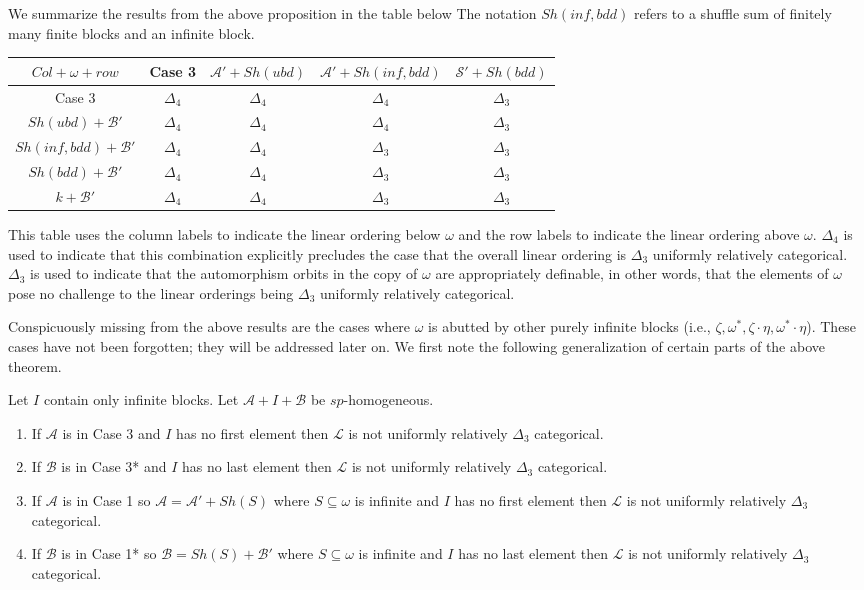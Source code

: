 \documentclass[11pt]{amsart}
\theoremstyle{definition}
\def\A{\mathcal A}
\def\B{\mathcal{B}}
\def\L{\mathcal L}
\def\S{{\mathcal S}}
\begin{document}
We summarize the results from the above proposition in the table below
The notation $Sh(inf, bdd)$ refers to a shuffle sum of finitely many finite blocks and an infinite block.
\begin{center}
\begin{tabular}{c|c|c|c|c}
     $Col+\omega+row$& Case 3 & $\A'+Sh(ubd)$ & $\A'+Sh(inf, bdd)$ & $\S'+Sh(bdd)$\\
     \hline
   Case 3  & $\Delta_4$ & $\Delta_4$ & $\Delta_4$ & $\Delta_3$  \\   \hline
   $Sh(ubd)+\B'$  & $\Delta_4$ & $\Delta_4$ & $\Delta_4$ & $\Delta_3$ \\  \hline
   $Sh(inf, bdd)+\B'$  & $\Delta_4$ & $\Delta_4$ & $\Delta_3$ & $\Delta_3$ \\  \hline
   $Sh(bdd)+\B'$  & $\Delta_4$ & $\Delta_4$ & $\Delta_3$ & $\Delta_3$ \\  \hline
   $k+\B'$  & $\Delta_4$ & $\Delta_4$ & $\Delta_3$ & $\Delta_3$
\end{tabular}
\end{center}

This table uses the column labels to indicate the linear ordering below $\omega$ and the row labels to indicate the linear ordering above $\omega$.
$\Delta_4$ is used to indicate that this combination explicitly precludes the case that the overall linear ordering is $\Delta_3$ uniformly relatively categorical.
$\Delta_3$ is used to indicate that the automorphism orbits in the copy of $\omega$ are appropriately definable, in other words, that the elements of $\omega$ pose no challenge to the linear orderings being $\Delta_3$ uniformly relatively categorical.

Conspicuously missing from the above results are the cases where $\omega$ is abutted by other purely infinite blocks (i.e., $\zeta, \omega^*, \zeta\cdot\eta, \omega^*\cdot\eta$).
These cases have not been forgotten; they will be addressed later on.
We first note the following generalization of certain parts of the above theorem.

\begin{theorem}\label{thm:generalizedFree}
    Let $I$ contain only infinite blocks. Let $\A+I+\B$ be $sp$-homogeneous.
    \begin{enumerate}
        \item If $\A$ is in Case 3 and $I$ has no first element then $\L$ is not uniformly relatively $\Delta_3$ categorical.
        \item If $\B$ is in Case 3* and $I$ has no last element then $\L$ is not uniformly relatively $\Delta_3$ categorical.
        \item If $\A$ is in Case 1 so $\A=\A'+Sh(S)$ where $S\subseteq\omega$ is infinite and $I$ has no first element then $\L$ is not uniformly relatively $\Delta_3$ categorical.
        \item If $\B$ is in Case 1* so $\B=Sh(S)+\B'$ where $S\subseteq\omega$ is infinite and $I$ has no last element then $\L$ is not uniformly relatively $\Delta_3$ categorical.
    \end{enumerate}
\end{theorem}
\end{document}
